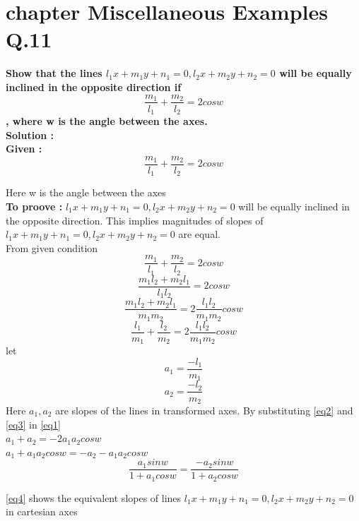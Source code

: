 \documentclass[journal,12pt,twocolumn]{IEEEtran}
\begin{document}
\section{ chapter  Miscellaneous Examples  Q.11 }

\textbf{Show that the lines $l_1x+m_1y+n_1=0,l_2x+m_2y+n_2=0$
will be equally inclined in the opposite direction if
\[\frac{m_1}{l_1}+\frac{m_2}{l_2}=2 cosw\], where w is the angle between the axes.}\\
\textbf{Solution :}\\
\textbf{Given :}\[\frac{m_1}{l_1}+\frac{m_2}{l_2}=2 cosw\]

Here w is the angle between the axes\\
\textbf{To proove :} $l_1x+m_1y+n_1=0, l_2x+m_2y+n_2=0$
will be equally inclined in the opposite direction.
This implies magnitudes of slopes of $l_1x+m_1y+n_1=0,l_2x+m_2y+n_2=0$ are equal.\\
From given condition
\[\frac{m_1}{l_1}+\frac{m_2}{l_2}=2 cosw\]
\[\frac{m_1l_2+m_2l_1}{l_1l_2}=2 cosw\]
\[\frac{m_1l_2+m_2l_1}{m_1m_2}=2\frac{l_1l_2}{m_1m_2} cosw\]
\begin{equation}\label{eq1}
\frac{l_1}{m_1}+\frac{l_2}{m_2}=2\frac{l_1l_2}{m_1m_2} cosw
\end{equation}
let
\begin{equation}\label{eq2}
a_1=\frac{-l_1}{m_1}
\end{equation}
\begin{equation}\label{eq3}
a_2=\frac{-l_2}{m_2}
\end{equation}
Here $a_1, a_2$ are slopes of the lines in transformed axes. By substituting \eqref{eq2} and \eqref{eq3} in \eqref{eq1}\\
$a_1+a_2=-2a_1a_2cosw$\\
$a_1+a_1a_2cosw=-a_2-a_1a_2cosw$
\begin{equation}\label{eq4}
\frac{a_1sinw}{1+a_1cosw}=\frac{-a_2sinw}{1+a_2cosw}
\end{equation}
    
\eqref{eq4} shows the equivalent slopes of lines $l_1x+m_1y+n_1=0,l_2x+m_2y+n_2=0$ in cartesian axes 
\end{document}
